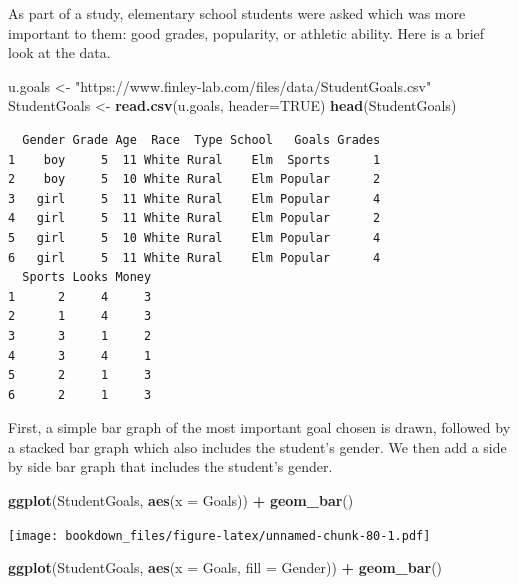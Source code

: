 \documentclass[
]{krantz}
\makeatletter
\newenvironment{Shaded}{\begin{snugshade}}{\end{snugshade}}
\newcommand{\DataTypeTok}[1]{\textcolor[rgb]{0.27,0.27,0.27}{#1}}
\newcommand{\KeywordTok}[1]{\textcolor[rgb]{0.27,0.27,0.27}{\textbf{#1}}}
\newcommand{\NormalTok}[1]{#1}
\newcommand{\OperatorTok}[1]{\textcolor[rgb]{0.43,0.43,0.43}{\textbf{#1}}}
\newcommand{\OtherTok}[1]{\textcolor[rgb]{0.37,0.37,0.37}{#1}}
\newcommand{\StringTok}[1]{\textcolor[rgb]{0.5,0.5,0.5}{#1}}
\newenvironment{kframe}{%
\medskip{}
\setlength{\fboxsep}{.8em}
 \def\at@end@of@kframe{}%
 \ifinner\ifhmode%
  \def\at@end@of@kframe{\end{minipage}}%
  \begin{minipage}{\columnwidth}%
 \fi\fi%
 \def\FrameCommand##1{\hskip\@totalleftmargin \hskip-\fboxsep
 \colorbox{shadecolor}{##1}\hskip-\fboxsep
     \hskip-\linewidth \hskip-\@totalleftmargin \hskip\columnwidth}%
 \MakeFramed {\advance\hsize-\width
   \@totalleftmargin\z@ \linewidth\hsize
   \@setminipage}}%
 {\par\unskip\endMakeFramed%
 \at@end@of@kframe}
\renewenvironment{Shaded}{\begin{kframe}}{\end{kframe}}
\makeatother
\begin{document}
As part of a study, elementary school students were asked which was more important to them: good grades, popularity, or athletic ability. Here is a brief look at the data.

\begin{Shaded}
\begin{Highlighting}[]
\NormalTok{u.goals \textless{}{-}}\StringTok{ "https://www.finley{-}lab.com/files/data/StudentGoals.csv"}
\NormalTok{StudentGoals \textless{}{-}}\StringTok{ }\KeywordTok{read.csv}\NormalTok{(u.goals, }\DataTypeTok{header=}\OtherTok{TRUE}\NormalTok{)}
\KeywordTok{head}\NormalTok{(StudentGoals)}
\end{Highlighting}
\end{Shaded}

\begin{verbatim}
  Gender Grade Age  Race  Type School   Goals Grades
1    boy     5  11 White Rural    Elm  Sports      1
2    boy     5  10 White Rural    Elm Popular      2
3   girl     5  11 White Rural    Elm Popular      4
4   girl     5  11 White Rural    Elm Popular      2
5   girl     5  10 White Rural    Elm Popular      4
6   girl     5  11 White Rural    Elm Popular      4
  Sports Looks Money
1      2     4     3
2      1     4     3
3      3     1     2
4      3     4     1
5      2     1     3
6      2     1     3
\end{verbatim}

First, a simple bar graph of the most important goal chosen is drawn, followed by a stacked bar graph which also includes the student's gender. We then add a side by side bar graph that includes the student's gender.

\begin{Shaded}
\begin{Highlighting}[]
\KeywordTok{ggplot}\NormalTok{(StudentGoals, }\KeywordTok{aes}\NormalTok{(}\DataTypeTok{x =}\NormalTok{ Goals)) }\OperatorTok{+}\StringTok{ }\KeywordTok{geom\_bar}\NormalTok{()}
\end{Highlighting}
\end{Shaded}

\texttt{[image: bookdown\_files/figure-latex/unnamed-chunk-80-1.pdf]}

\begin{Shaded}
\begin{Highlighting}[]
\KeywordTok{ggplot}\NormalTok{(StudentGoals, }\KeywordTok{aes}\NormalTok{(}\DataTypeTok{x =}\NormalTok{ Goals, }\DataTypeTok{fill =}\NormalTok{ Gender)) }\OperatorTok{+}\StringTok{ }\KeywordTok{geom\_bar}\NormalTok{()}
\end{Highlighting}
\end{Shaded}
\end{document}

